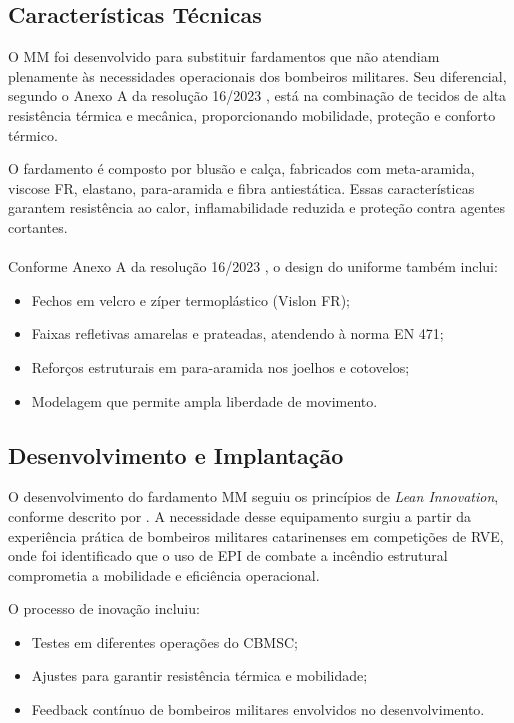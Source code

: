 \subsection{Características Técnicas}

O \acrlong{MM} foi desenvolvido para substituir fardamentos que não atendiam plenamente às necessidades operacionais dos bombeiros militares. Seu diferencial, segundo o Anexo A da resolução 16/2023 \cite{res16}, está na combinação de tecidos de alta resistência térmica e mecânica, proporcionando mobilidade, proteção e conforto térmico.

O fardamento é composto por blusão e calça, fabricados com meta-aramida, viscose FR, elastano, para-aramida e fibra antiestática. Essas características garantem resistência ao calor, inflamabilidade reduzida e proteção contra agentes cortantes. 
\\\\
Conforme Anexo A da resolução 16/2023 \cite{res16}, o design do uniforme também inclui:
\begin{itemize}
    \item Fechos em velcro e zíper termoplástico (Vislon FR);
    \item Faixas refletivas amarelas e prateadas, atendendo à norma EN 471;
    \item Reforços estruturais em para-aramida nos joelhos e cotovelos;
    \item Modelagem que permite ampla liberdade de movimento.
\end{itemize}

\begin{centering}
\end{centering}

\subsection{Desenvolvimento e Implantação}

O desenvolvimento do fardamento \acrlong{MM} seguiu os princípios de \textit{Lean Innovation}, conforme descrito por \textcite{Melina2023}. A necessidade desse equipamento surgiu a partir da experiência prática de bombeiros militares catarinenses em competições de \acrfull{RVE}, onde foi identificado que o uso de \acrshort{EPI} de combate a incêndio estrutural comprometia a mobilidade e eficiência operacional.

O processo de inovação incluiu:
\begin{itemize}
    \item Testes em diferentes operações do \acrshort{CBMSC};
    \item Ajustes para garantir resistência térmica e mobilidade;
    \item Feedback contínuo de bombeiros militares envolvidos no desenvolvimento.
\end{itemize}

